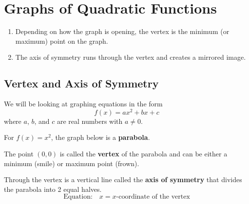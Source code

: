 \documentclass{article}
\begin{document}
\section*{Graphs of Quadratic Functions}

\begin{tcolorbox}[colframe=orange!70!white, coltitle=black, title=\textbf{Summary}]
\begin{enumerate}
    \item Depending on how the graph is opening, the vertex is the minimum (or maximum) point on the graph.
    \item The axis of symmetry runs through the vertex and creates a mirrored image.
\end{enumerate}
\end{tcolorbox}

\subsection*{Vertex and Axis of Symmetry}

We will be looking at graphing equations in the form
\[ f(x) = ax^2 + bx + c \]
where $a$, $b$, and $c$ are real numbers with $a \neq 0$. 
\bigskip 


For $f(x)= x^2$, the graph below is a \textbf{parabola}.
\newline\\

\begin{center}
\end{center}
\bigskip 


The point $(0,0)$ is called the {\color{blue}\textbf{vertex}} of the parabola and can be either a minimum (smile) or maximum point (frown). 
\bigskip 

Through the vertex is a vertical line called the {\color{blue}\textbf{axis of symmetry}} that divides the parabola into 2 equal halves. 
\[
\text{Equation:} \quad x = x\text{-coordinate of the vertex}
\]
\end{document}
